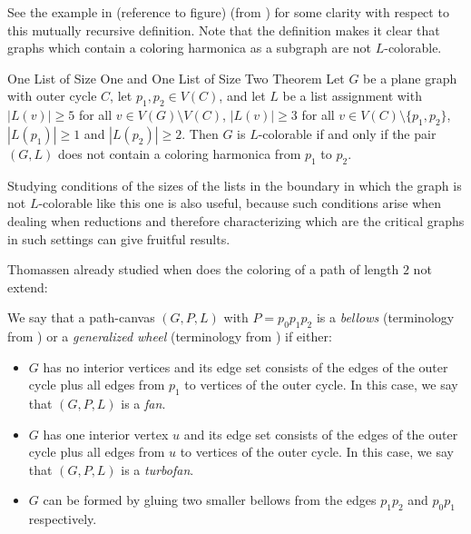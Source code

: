 
See the example in (reference to figure) (from \cite{fivelistcoloring3}) for some clarity with respect to this mutually recursive definition. Note that the definition makes it clear that graphs which contain a coloring harmonica as a subgraph are not $L$-colorable. 

\begin{theorem}{One List of Size One and One List of Size Two Theorem \cite{fivelistcoloring3}}
Let $G$ be a plane graph with outer cycle $C$, let $p_1, p_2 \in V(C)$, and let
$L$ be a list assignment with $|L(v)| \geq 5$ for all $v \in V(G) \setminus V(C)$, $|L(v)| \geq 3$ for all
$v \in V (C) \setminus \{p_1 , p_2\}$, $|L(p_1)| \geq 1$ and $|L(p_2)| \geq 2$. Then $G$ is $L$-colorable if and only if the pair $(G, L)$ does not contain a coloring harmonica from $p_1$ to $p_2$.
\end{theorem}

Studying conditions of the sizes of the lists in the boundary in which the graph is not $L$-colorable like this one is also useful, because such conditions arise when dealing when reductions and therefore characterizing which are the critical graphs in such settings can give fruitful results.

Thomassen already studied when does the coloring of a path of length $2$ not extend:

\begin{definition}[Bellows]
	We say that a path-canvas $(G, P, L)$ with $P = p_0p_1p_2$ is a \emph{bellows} (terminology from \cite{postlethesis}) or a \emph{generalized wheel} (terminology from \cite{thomassenexponentiallymany5listcolorings}) if either:
	\begin{itemize}
		\item $G$ has no interior vertices and its edge set consists of the edges of the outer cycle plus all edges from $p_1$ to vertices of the outer cycle. In this case, we say that $(G, P, L)$ is a \emph{fan}.
		\item $G$ has one interior vertex $u$ and its edge set consists of the edges of the outer cycle plus all edges from $u$ to vertices of the outer cycle. In this case, we say that $(G, P, L)$ is a \emph{turbofan}.
		\item $G$ can be formed by gluing two smaller bellows from the edges $p_1p_2$ and $p_0p_1$ respectively. 
	\end{itemize}
\end{definition}

